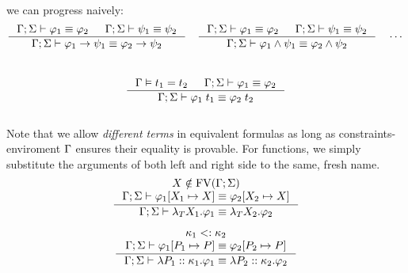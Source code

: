 \documentclass[english, mgr]{iithesis}
\begin{document}
we can progress naively:
\\
$$
  \inference{
    \jgmnt[\Gamma; \Sigma]{\formphi_1 \equiv \formphi_2 } &
    \jgmnt[\Gamma; \Sigma]{\psi_1 \equiv \psi_2 }
    }{
    \jgmnt[\Gamma; \Sigma]{\formphi_1 \fImp \psi_1 \equiv \formphi_2 \fImp \psi_2 }
  }
  \quad
  \inference{
    \jgmnt[\Gamma; \Sigma]{\formphi_1 \equiv \formphi_2 } &
    \jgmnt[\Gamma; \Sigma]{\psi_1 \equiv \psi_2 }
    }{
    \jgmnt[\Gamma; \Sigma]{\formphi_1 \wedge \psi_1 \equiv \formphi_2 \wedge \psi_2 }
  }
  \quad
  \cdots
$$
\\
$$
  \inference{
    \cjgmnt[\Gamma]{\term_1 \ceq \term_2} &
    \jgmnt[\Gamma; \Sigma]{\formphi_1 \equiv \formphi_2 }
    }{
    \jgmnt[\Gamma; \Sigma]{\formphi_1 \fAppTerm \term_1 \equiv \formphi_2 \fAppTerm \term_2 }
  }
$$
\\
Note that we allow \textit{different terms} in equivalent formulas as long as
constraints-enviroment $\Gamma$ ensures their equality is provable.
For functions, we simply substitute the arguments of both left and right side
to the same, fresh name.
\\
$$
  \inference{
    \termv \notin \fv[\Gamma; \Sigma] \\
    \jgmnt[\Gamma; \Sigma]{\formphi_1[\termv_1 \mapsto \termv] \equiv \formphi_2[\termv_2 \mapsto \termv] }
    }{
    \jgmnt[\Gamma; \Sigma]{\fLamTerm{\termv_1}\formphi_1 \equiv \fLamTerm{\termv_2}\formphi_2 }
  }
$$

$$
  \inference{
    \kind_1 \subkind \kind_2 \\
    \jgmnt[\Gamma; \Sigma]{\formphi_1[P_1 \mapsto P] \equiv \formphi_2[P_2 \mapsto P] }
    }{
    \jgmnt[\Gamma; \Sigma]{\fLamForm{P_1}{\kind_1}{\formphi_1} \equiv \fLamForm{P_2}{\kind_2}{\formphi_2}}
  }
$$
\end{document}
